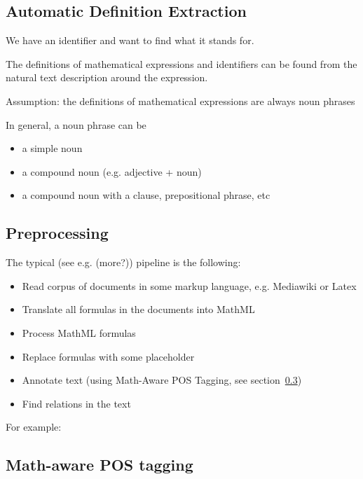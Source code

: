 \subsection{Automatic Definition Extraction}
We have an identifier and want to find what it stands for.

The definitions of mathematical expressions and identifiers can be found from
the natural text description around the expression.

Assumption: the definitions of mathematical expressions are always noun phrases

In general, a noun phrase can be

\begin{itemize}
  \item a simple noun
  \item a compound noun (e.g. adjective + noun)
  \item a compound noun with a clause, prepositional phrase, etc
\end{itemize}



\subsection{Preprocessing}

The typical (see e.g. \cite{kristianto2012extracting} \cite{pagael2014mlp} (more?)) pipeline is the following:

\begin{itemize}
  \item Read corpus of documents in some markup language, e.g. Mediawiki or Latex
  \item Translate all formulas in the documents into MathML
  \item Process MathML formulas
  \item Replace formulas with some placeholder
  \item Annotate text (using Math-Aware POS Tagging, see section~\ref{sec:postagging})
  \item Find relations in the text
\end{itemize}


For example:




\subsection{Math-aware POS tagging} \label{sec:postagging}


